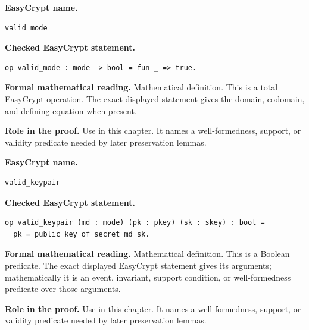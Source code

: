 \begin{formaldefinition}
\noindent\textbf{EasyCrypt name.}
\begin{lstlisting}[language=EasyCrypt,basicstyle=\ttfamily\scriptsize]
valid_mode
\end{lstlisting}
\noindent\textbf{Checked EasyCrypt statement.}
\begin{lstlisting}[language=EasyCrypt,basicstyle=\ttfamily\scriptsize]
op valid_mode : mode -> bool = fun _ => true.
\end{lstlisting}
\noindent\textbf{Formal mathematical reading.}
Mathematical definition. This is a total EasyCrypt operation.  The exact displayed statement gives the domain, codomain, and defining equation when present.

\noindent\textbf{Role in the proof.}
Use in this chapter. It names a well-formedness, support, or validity predicate needed by later preservation lemmas.

\end{formaldefinition}

\begin{formaldefinition}
\noindent\textbf{EasyCrypt name.}
\begin{lstlisting}[language=EasyCrypt,basicstyle=\ttfamily\scriptsize]
valid_keypair
\end{lstlisting}
\noindent\textbf{Checked EasyCrypt statement.}
\begin{lstlisting}[language=EasyCrypt,basicstyle=\ttfamily\scriptsize]
op valid_keypair (md : mode) (pk : pkey) (sk : skey) : bool =
  pk = public_key_of_secret md sk.
\end{lstlisting}
\noindent\textbf{Formal mathematical reading.}
Mathematical definition. This is a Boolean predicate.  The exact displayed EasyCrypt statement gives its arguments; mathematically it is an event, invariant, support condition, or well-formedness predicate over those arguments.

\noindent\textbf{Role in the proof.}
Use in this chapter. It names a well-formedness, support, or validity predicate needed by later preservation lemmas.

\end{formaldefinition}

